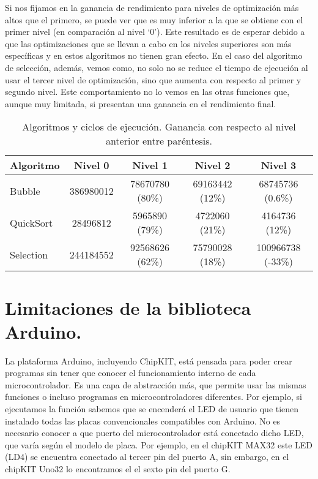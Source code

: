 Si nos fijamos en la ganancia de rendimiento para niveles de optimización más altos que el primero, se puede ver que es muy inferior a la que se obtiene con el primer nivel (en comparación al nivel `0'). Este resultado es de esperar debido a que las optimizaciones que se llevan a cabo en los niveles superiores son más específicas y en estos algoritmos no tienen gran efecto. En el caso del algoritmo de selección, además, vemos como, no solo no se reduce el tiempo de ejecución al usar el tercer nivel de optimización, sino que aumenta con respecto al primer y segundo nivel. Este comportamiento no lo vemos en las otras funciones que, aunque muy limitada, si presentan una ganancia en el rendimiento final.
\begin{table}[htb]
	\begin{center}
		\begin{tabular}{|l|c|c|c|c|}
			\hline
			Algoritmo & Nivel 0 & Nivel 1 & Nivel 2 & Nivel 3 \\
			\hline
			\hline
			Bubble		&	386980012	&	78670780 (80\%)	&	69163442 (12\%)	&	68745736 (0.6\%) \\
			\hline
			QuickSort	&	28496812	&	5965890	(79\%)	&	4722060 (21\%)	&	4164736 (12\%) \\
			\hline
			Selection &	244184552	&	92568626 (62\%)	&	75790028 (18\%)	&	100966738 (-33\%) \\
			\hline
		\end{tabular}
	\end{center}
\caption{Algoritmos y ciclos de ejecución. Ganancia con respecto al nivel anterior entre paréntesis.}
\label{tabla:ciclos}
\end{table}
\section{Limitaciones de la biblioteca Arduino.} %
\label{sec:Limitaciones de la biblioteca Arduino.}

La plataforma Arduino, incluyendo ChipKIT, está pensada para poder crear programas sin tener que conocer el funcionamiento interno de cada microcontrolador. Es una capa de abstracción más, que permite usar las mismas funciones o incluso programas en microcontroladores diferentes. Por ejemplo, si ejecutamos la función  sabemos que se encenderá el LED de usuario que tienen instalado todas las placas convencionales compatibles con Arduino. No es necesario conocer a que puerto del microcontrolador está conectado dicho LED, que varía según el modelo de placa. Por ejemplo, en el chipKIT MAX32 este LED (LD4) se encuentra conectado al tercer pin del puerto A, sin embargo, en el chipKIT Uno32 lo encontramos el el sexto pin del puerto G.

